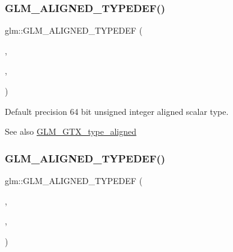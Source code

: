 \subsubsection{\texorpdfstring{G\+L\+M\+\_\+\+A\+L\+I\+G\+N\+E\+D\+\_\+\+T\+Y\+P\+E\+D\+E\+F()}{GLM\_ALIGNED\_TYPEDEF()}\hspace{0.1cm}{\footnotesize\ttfamily [133/209]}}
{\footnotesize\ttfamily glm\+::\+G\+L\+M\+\_\+\+A\+L\+I\+G\+N\+E\+D\+\_\+\+T\+Y\+P\+E\+D\+EF (\begin{DoxyParamCaption}\item[{\hyperlink{group__gtc__type__precision_gaf0a59fdb715cf4ddf0c4dabf0e2286a9}{u64vec1}}]{,  }\item[{aligned\+\_\+u64vec1}]{,  }\item[{8}]{ }\end{DoxyParamCaption})}

Default precision 64 bit unsigned integer aligned scalar type. \begin{DoxySeeAlso}{See also}
\hyperlink{group__gtx__type__aligned}{G\+L\+M\+\_\+\+G\+T\+X\+\_\+type\+\_\+aligned} 
\end{DoxySeeAlso}
\mbox{\label{group__gtx__type__aligned_ga929427a7627940cdf3304f9c050b677d}} 
\subsubsection{\texorpdfstring{G\+L\+M\+\_\+\+A\+L\+I\+G\+N\+E\+D\+\_\+\+T\+Y\+P\+E\+D\+E\+F()}{GLM\_ALIGNED\_TYPEDEF()}\hspace{0.1cm}{\footnotesize\ttfamily [134/209]}}
{\footnotesize\ttfamily glm\+::\+G\+L\+M\+\_\+\+A\+L\+I\+G\+N\+E\+D\+\_\+\+T\+Y\+P\+E\+D\+EF (\begin{DoxyParamCaption}\item[{\hyperlink{group__gtc__type__precision_gaddd85665767e5d32aee8516f00c45f59}{u64vec2}}]{,  }\item[{aligned\+\_\+u64vec2}]{,  }\item[{16}]{ }\end{DoxyParamCaption})}

